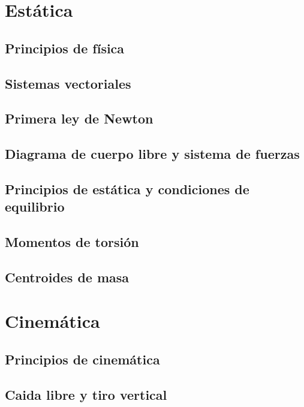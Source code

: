 \documentclass{../summarie}
\begin{document}
\Portada
\Indice
\fancystyle
\onehalfspacing


\part{Estática}

    \chapter{Principios de física}
        
        
    \chapter{Sistemas vectoriales}
        
        
    \chapter{Primera ley de Newton}
    \chapter{Diagrama de cuerpo libre y sistema de fuerzas}
    \chapter{Principios de estática y condiciones de equilibrio}
    \chapter{Momentos de torsión}
    \chapter{Centroides de masa}

\part{Cinemática}

    \chapter{Principios de cinemática}
    \chapter{Caida libre y tiro vertical}
\end{document}

